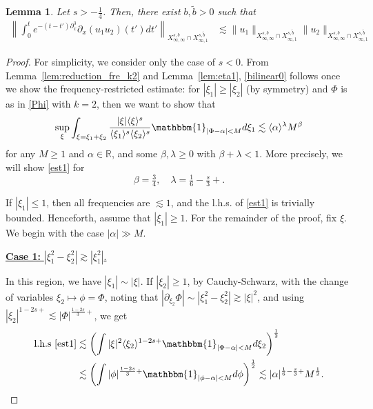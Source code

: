\documentclass[a4paper,
11pt,  reqno]{amsart}
\newcommand{\fia}{\mathbbm{1}_{|\Phi-\alpha|<M}}
\newcommand{\jap}[1]{\langle #1 \rangle}
\newcommand{\5}{\textup{V}}
\newcommand{\noi}{\noindent}
\newcommand{\les}{\lesssim}
\newcommand{\wt}{\widetilde}
\newtheorem{lemma}[theorem]{Lemma}
\theoremstyle{remark}
\newcommand{\R}{\mathbb{R}}
\newcommand{\al}{\alpha}
\newcommand{\be}{\beta}
\newcommand{\ld}{\lambda}
\newcommand{\ges}{\gtrsim}
\numberwithin{equation}{section}
\numberwithin{theorem}{section}
\begin{document}
\begin{lemma}\label{LEM:bil0}
Let $s>-\frac14$. Then, there exist $b,\wt b >0 $
 such that
\begin{align}
\label{bilinear0}
\left\|\int_0^te^{-(t-t')\partial_x^3}\partial_x(u_1u_2) (t')dt' \right\|_{X^{s,b}_{\infty, \infty}\cap X^{s,\wt{b}}_{\infty, 1} } & \les
\|u_1\|_{X^{s,b}_{\infty, \infty}\cap X^{s,\wt{b}}_{\infty, 1} }
\|u_2\|_{X^{s,b}_{\infty, \infty}\cap X^{s,\wt{b}}_{\infty, 1} }
\end{align}
\end{lemma}



\begin{proof}


For simplicity, we consider only the case of $s<0$.
From Lemma~\ref{lem:reduction_fre_k2} and Lemma~\ref{lem:eta1}, \eqref{bilinear0} follows once we show the frequency-restricted estimate: for $|\xi_1| \ge |\xi_2|$ (by symmetry) and $\Phi$ is as in \eqref{Phi} with $k=2$, then we want to show that
\begin{equation}
\label{est1}
\sup_{\xi} \int_{\xi=\xi_1+\xi_2}
\frac{|\xi|\jap{\xi}^s}{\jap{\xi_1}^{s}\jap{\xi_2}^s}
\fia d\xi_1
\lesssim
\jap{\al}^{\ld } M^{\be}
\end{equation}
for any $M\ge 1$ and $\al\in\R$, and some $\be,\ld \ge 0$ with $\be+\ld < 1$. More precisely, we will show \eqref{est1} for
$$
\beta=\tfrac34,\quad \lambda=\tfrac{1}{6}-\tfrac s3+.
$$


If $|\xi_1| \le 1$, then all frequencies are $\les1$, and the l.h.s. of \eqref{est1} is trivially bounded. Henceforth, assume that $|\xi_1| \ge 1$.
For the remainder of the proof, fix $\xi$. We begin with the case $|\alpha|\gg M$.




\noi
\underline{\textbf{Case 1:} $|\xi_1^2-\xi_2^2| \gtrsim |\xi_1^2|$.}

In this region, we have $|\xi_1|\sim |\xi|$. If $|\xi_2|\ge 1$, by Cauchy-Schwarz, with the change of variables $\xi_2\mapsto \phi=\Phi$, noting that $|\partial_{\xi_2} \Phi|\sim |\xi_1^2 - \xi_2^2| \ges |\xi|^2$, and using $|\xi_2|^{1-2s+}\lesssim |\Phi|^{\frac{1-2s}{3}+}$, we get
\begin{align*}
\text{l.h.s \eqref{est1}}
& \les \left(\int |\xi|^2\jap{\xi_2}^{1-2s+}\fia d\xi_2\right)^\frac12\\&\lesssim \left(\int |\phi|^{\frac{1-2s}{3}+}\mathbbm{1}_{|\phi-\alpha|<M} d\phi\right)^\frac12\lesssim |\alpha|^{\frac16 - \frac s3 +} M^{\frac12}.
\end{align*}



\end{proof}
\end{document}
